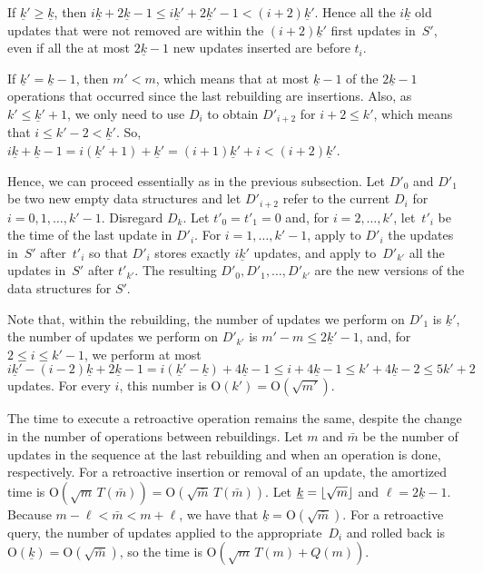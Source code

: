 \documentclass[reqno,11pt]{amsart}
\DeclarePairedDelimiter\floor{\lfloor}{\rfloor}
\newcommand{\Oh}{\mathrm{O}}
\begin{document}
If $\underline{k}' \geq \underline{k}$, then
$i\underline{k}+2\underline{k}-1 \leq i\underline{k}'+2\underline{k}'-1 < (i+2)\underline{k}'$.
Hence all the $i\underline{k}$ old updates that were not removed 
are within the $(i+2)\underline{k}'$ first updates in~$S'$, 
even if all the at most $2\underline{k}-1$ new updates inserted are before $t_i$. 

If $\underline{k}' = \underline{k}-1$, then $m'<m$, 
which means that at most $\underline{k}-1$ of the $2\underline{k}-1$ 
operations that occurred since the last rebuilding are insertions. 
Also, as $k' \leq \underline{k}'+1$, 
we only need to use $D_i$ to obtain $D'_{i+2}$ for $i+2 \leq k'$, 
which means that $i \leq k'-2 < \underline{k}'$.  
So, $i\underline{k}+\underline{k}-1 = i(\underline{k}'+1)+\underline{k}' 
= (i+1)\underline{k}'+i <  (i+2)\underline{k}'$. 

Hence, we can proceed essentially as in the previous subsection.
Let $D'_0$ and $D'_1$ be two new empty data structures 
and let $D'_{i+2}$ refer to the current $D_i$ for~$i=0,1,\ldots,k'-1$.  Disregard $D_k$.   
Let $t'_0 = t'_1 = 0$ and, for $i=2,\ldots,k'$, 
let~$t'_i$ be the time of the last update in $D'_i$.
For $i=1,\ldots,k'-1$, apply to $D'_i$ the updates in~$S'$ 
after~$t'_i$ so that $D'_i$ stores exactly $i\underline{k}'$ updates, 
and apply to~$D'_{k'}$ all the updates in~$S'$ after $t'_{k'}$. 
The resulting $D'_0,D'_1,\ldots,D'_{k'}$ are the new versions of the data structures for $S'$. 

Note that, within the rebuilding, 
the number of updates we perform on $D'_1$ is $\underline{k}'$, 
the number of updates we perform on $D'_{k'}$ is $m'-m \leq 2\underline{k}'-1$, 
and, for $2 \leq i \leq k'-1$, we perform at most 
$i\underline{k}' - (i-2)\underline{k}+2\underline{k}-1
 = i(\underline{k}'-\underline{k})+4\underline{k}-1 
\leq i+4\underline{k}-1 \leq k'+4\underline{k}-2 \leq 5k'+2$ updates. 
For every $i$, this number is $\Oh(k') = \Oh(\sqrt{m'})$.


The time to execute a retroactive operation remains the same, 
despite the change in the number of operations between rebuildings.
Let $m$ and $\bar{m}$ be the number of updates in the sequence at 
the last rebuilding and when an operation is done, respectively.
For a retroactive insertion or removal of an update, the amortized time 
is $\Oh(\sqrt{m}\,T(\bar{m})) = \Oh(\sqrt{\bar{m}}\,T(\bar{m}))$.  
Let $\underline{k} = \floor{\sqrt{m}}$ and $\ell = 2\underline{k}-1$. 
Because $m-\ell < \bar{m} < m+\ell$, we have that $\underline{k} = \Oh(\sqrt{\bar{m}})$. 
For a retroactive query, the number of updates applied to the 
appropriate~$D_i$ and rolled back is $\Oh(\underline{k}) = \Oh(\sqrt{\bar{m}})$, 
so the time is $\Oh(\sqrt{m}\,T(m)+Q(m))$.  
\end{document}
